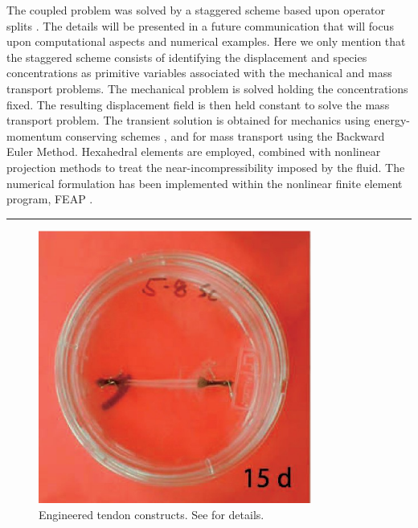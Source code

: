 The coupled problem was solved by a staggered scheme based upon
operator splits
\citep{Armero-poroplasticity:99,Garikipatietal:01}. The details 
will be presented in a future communication that will focus upon
computational aspects and numerical examples. Here we only mention
that the staggered scheme consists of identifying the displacement
and species concentrations as primitive variables associated with
the mechanical and mass transport problems. The mechanical problem
is solved holding the concentrations fixed. The resulting
displacement field is then held constant to solve the mass
transport problem. The transient solution is obtained for
mechanics using energy-momentum conserving schemes
\citep{SimoTarnow:1992b,SimoTarnow:1992a,Gonzalezphd:1996}, and
for mass transport using the Backward Euler Method. Hexahedral
elements are employed, combined with nonlinear projection methods
\citep{simotaylorpister:85} to treat the near-incompressibility
imposed by the fluid. The numerical formulation has been
implemented within the nonlinear finite element program, FEAP
\citep{feapmanual}.

\hrule 

\begin{figure}[!hpt]
\centering
  \includegraphics[width=0.8\textwidth]{images/experiments/one-construct}
\caption{Engineered tendon constructs. See \citet{Calve:04} for
  details.} 
\label{engconst}
\end{figure}

